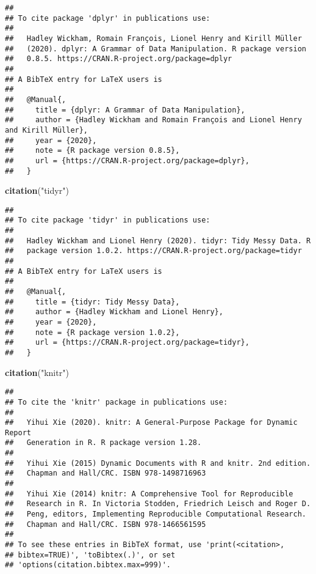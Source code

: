 \documentclass[
]{article}
\newenvironment{Shaded}{\begin{snugshade}}{\end{snugshade}}
\newcommand{\KeywordTok}[1]{\textcolor[rgb]{0.13,0.29,0.53}{\textbf{#1}}}
\newcommand{\NormalTok}[1]{#1}
\newcommand{\StringTok}[1]{\textcolor[rgb]{0.31,0.60,0.02}{#1}}
\begin{document}
\begin{verbatim}
## 
## To cite package 'dplyr' in publications use:
## 
##   Hadley Wickham, Romain François, Lionel Henry and Kirill Müller
##   (2020). dplyr: A Grammar of Data Manipulation. R package version
##   0.8.5. https://CRAN.R-project.org/package=dplyr
## 
## A BibTeX entry for LaTeX users is
## 
##   @Manual{,
##     title = {dplyr: A Grammar of Data Manipulation},
##     author = {Hadley Wickham and Romain François and Lionel Henry and Kirill Müller},
##     year = {2020},
##     note = {R package version 0.8.5},
##     url = {https://CRAN.R-project.org/package=dplyr},
##   }
\end{verbatim}

\begin{Shaded}
\begin{Highlighting}[]
\KeywordTok{citation}\NormalTok{(}\StringTok{"tidyr"}\NormalTok{)}
\end{Highlighting}
\end{Shaded}

\begin{verbatim}
## 
## To cite package 'tidyr' in publications use:
## 
##   Hadley Wickham and Lionel Henry (2020). tidyr: Tidy Messy Data. R
##   package version 1.0.2. https://CRAN.R-project.org/package=tidyr
## 
## A BibTeX entry for LaTeX users is
## 
##   @Manual{,
##     title = {tidyr: Tidy Messy Data},
##     author = {Hadley Wickham and Lionel Henry},
##     year = {2020},
##     note = {R package version 1.0.2},
##     url = {https://CRAN.R-project.org/package=tidyr},
##   }
\end{verbatim}

\begin{Shaded}
\begin{Highlighting}[]
\KeywordTok{citation}\NormalTok{(}\StringTok{"knitr"}\NormalTok{)}
\end{Highlighting}
\end{Shaded}

\begin{verbatim}
## 
## To cite the 'knitr' package in publications use:
## 
##   Yihui Xie (2020). knitr: A General-Purpose Package for Dynamic Report
##   Generation in R. R package version 1.28.
## 
##   Yihui Xie (2015) Dynamic Documents with R and knitr. 2nd edition.
##   Chapman and Hall/CRC. ISBN 978-1498716963
## 
##   Yihui Xie (2014) knitr: A Comprehensive Tool for Reproducible
##   Research in R. In Victoria Stodden, Friedrich Leisch and Roger D.
##   Peng, editors, Implementing Reproducible Computational Research.
##   Chapman and Hall/CRC. ISBN 978-1466561595
## 
## To see these entries in BibTeX format, use 'print(<citation>,
## bibtex=TRUE)', 'toBibtex(.)', or set
## 'options(citation.bibtex.max=999)'.
\end{verbatim}
\end{document}
